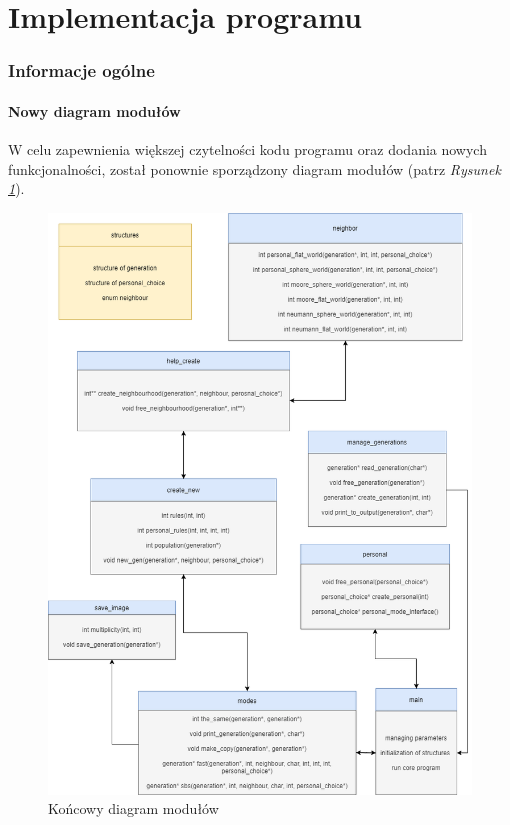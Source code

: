 \documentclass[a4paper]{article}
\begin{document}
\newpage

\part{Implementacja programu}

\section{Informacje og\'olne}

\subsection{Nowy diagram modu\l{}\'ow}
\quad W celu zapewnienia wi\k{e}kszej czytelno\'sci kodu programu oraz dodania nowych funkcjonalno\'sci, 
zosta\l{} ponownie sporz\k{a}dzony diagram modu\l{}\'ow (patrz \textit{Rysunek \ref{fig:Diagram}}).

        \begin{figure}[h]
                \centering
                \includegraphics[scale=0.37]{Diagram}
		\caption{Ko\'ncowy diagram modu\l{}\'ow}
		\label{fig:Diagram}
        \end{figure}
\end{document}
